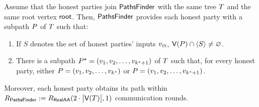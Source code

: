 \begin{lemma} \label{lemma:path-finder}
    Assume that the honest parties join $\textsf{PathsFinder}$ with the same tree $T$ and the same root vertex $\textsf{root}$. Then, $\textsf{PathsFinder}$ provides each honest party with a subpath $P$ of $T$ such that:
    \begin{enumerate}[nosep]
        \item If $S$ denotes the set 
        of honest parties' inputs $v_{\textsc{in}}$,  $\textsf{V}(P) \cap \langle{S}\rangle \neq \varnothing$.
        \item There is a subpath $P^{\star} = (v_1, v_2, \ldots, v_{k^\star + 1})$ of $T$ such that, for every honest party, either $P = (v_1, v_2, \ldots, v_{k^\star})$ or $P = (v_1, v_2, \ldots, v_{k^\star + 1})$.
    \end{enumerate}
    Moreover, each honest party obtains its path within $R_{\textsf{PathsFinder}} := R_{\textsf{RealAA}}( 2\cdot\big\lvert\textsf{V}(T)\big\rvert, 1)$ communication rounds.
\end{lemma}
